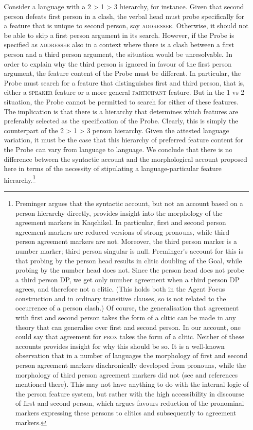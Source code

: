 \documentclass[output=paper]{langsci/langscibook}
\begin{document}
  Consider a language with a 2 > 1 > 3 hierarchy, for instance. Given that second person defeats first person in a clash, the verbal head must probe specifically for a feature that is unique to second person, say \textsc{addressee}. Otherwise, it should not be able to skip a first person argument in its search. However, if the Probe is specified as \textsc{addressee} also in a context where there is a clash between a first person and a third person argument, the situation would be unresolvable. In order to explain why the third person is ignored in favour of the first person argument, the feature content of the Probe must be different. In particular, the Probe must search for a feature that distinguishes first and third person, that is, either a \textsc{speaker} feature or a more general \textsc{participant} feature. But in the 1 vs 2 situation, the Probe cannot be permitted to search for either of these features. The implication is that there is a hierarchy that determines which features are preferably selected as the specification of the Probe. Clearly, this is simply the counterpart of the 2 > 1 > 3 person hierarchy. Given the attested language variation, it must be the case that this hierarchy of preferred feature content for the Probe can vary from language to language. We conclude that there is no difference between the syntactic account and the morphological account proposed here in terms of the necessity of stipulating a language-particular feature hierarchy.\footnote{Preminger argues that the syntactic account, but not an account based on a person hierarchy directly, provides insight into the morphology of the agreement markers in Kaqchikel. In particular, first and second person agreement markers are reduced versions of strong pronouns, while third person agreement markers are not. Moreover, the third person marker is a number marker; third person singular is null. Preminger’s account for this is that probing by the person head results in clitic doubling of the Goal, while probing by the number head does not. Since the person head does not probe a third person DP, we get only number agreement when a third person DP agrees, and therefore not a clitic. (This holds both in the Agent Focus construction and in ordinary transitive clauses, so is not related to the occurrence of a person clash.) Of course, the generalisation that agreement with first and second person takes the form of a clitic can be made in any theory that can generalise over first and second person. In our account, one could say that agreement for \textsc{prox} takes the form of a clitic. Neither of these accounts provides insight for why this should be so. It is a well-known observation that in a number of languages the morphology of first and second person agreement markers diachronically developed from pronouns, while the morphology of third person agreement markers did not (see \citealt{Fuß2005} and references mentioned there). This may not have anything to do with the internal logic of the person feature system, but rather with the high accessibility in discourse of first and second person, which \citet{Ariel2000} argues favours reduction of the pronominal markers expressing these persons to clitics and subsequently to agreement markers.}
\end{document}
